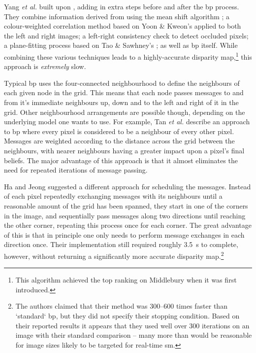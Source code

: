 Yang \textit{et al.} \cite{Yang2006a} built upon , adding in extra steps before and after the \gls{bp} process.  They combine information derived from using the mean shift algorithm \cite{Comaniciu2002}; a colour-weighted correlation method based on Yoon \& Kweon's \cite{Yoon2006} applied to both the left and right images; a left-right consistency check to detect occluded pixels; a plane-fitting process based on Tao \& Sawhney's \cite{Tao2000}; as well as \gls{bp} itself.  While combining these various techniques leads to a highly-accurate disparity map,\footnote{This algorithm achieved the top ranking on Middlebury when it was first introduced.} this approach is \emph{extremely} slow.

Typical \gls{bp} uses the four-connected neighbourhood to define the neighbours of each given node in the grid.  This means that each node passes messages to and from it's immediate neighbours up, down and to the left and right of it in the grid.  Other neighbourhood arrangements are possible though, depending on the underlying model one wants to use.  For example, Tan \textit{et al.} \cite{Tan2017} describe an approach to \gls{bp} where every pixel is considered to be a neighbour of every other pixel.  Messages are weighted according to the distance across the grid between the neighbours, with nearer neighbours having a greater impact upon a pixel's final beliefs.  The major advantage of this approach is that it almost eliminates the need for repeated iterations of message passing.

Ha and Jeong \cite{Ha2016} suggested a different approach for scheduling the messages.  Instead of each pixel repeatedly exchanging messages with its neighbours until a reasonable amount of the grid has been spanned, they start in one of the corners in the image, and sequentially pass messages along two directions until reaching the other corner, repeating this process once for each corner.  The great advantage of this is that in principle one only needs to perform message exchanges in each direction once.  Their implementation still required roughly \SI{3.5}{\second} to complete, however, without returning a significantly more accurate disparity map.\footnote{The authors claimed that their method was \numrange{300}{600} times faster than `standard` \gls{bp}, but they did not specify their stopping condition.  Based on their reported results it appears that they used well over 300 iterations on an image with their standard comparison -- many more than would be reasonable for image sizes likely to be targeted for real-time \gls{sm}.}

